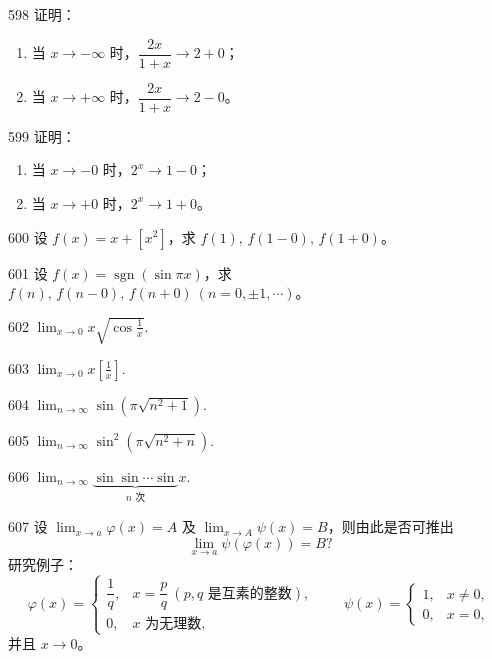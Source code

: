 \begin{prob}[M]{598}
证明：
\begin{enumerate}[label=(\alph*), itemsep=2pt, topsep=3pt]
  \item 当 $x \to -\infty$ 时，$\dfrac{2x}{1+x} \to 2 + 0$；
  \item 当 $x \to +\infty$ 时，$\dfrac{2x}{1+x} \to 2 - 0$。
\end{enumerate}
\end{prob}

\begin{prob}[M]{599}
证明：
\begin{enumerate}[label=(\alph*), itemsep=2pt, topsep=3pt]
  \item 当 $x \to -0$ 时，$2^x \to 1 - 0$；
  \item 当 $x \to +0$ 时，$2^x \to 1 + 0$。
\end{enumerate}
\end{prob}

\begin{prob}[S]{600}
设 $f(x) = x + [x^2]$，求 $f(1),\, f(1-0),\, f(1+0)$。
\end{prob}

\begin{prob}[S]{601}
设 $f(x) = \operatorname{sgn}(\sin\pi x)$，求 $f(n),\, f(n-0),\, f(n+0) \ (n = 0, \pm 1, \cdots)$。
\end{prob}


\begin{prob}[S]{602}
$\displaystyle \lim_{x\to 0} x\sqrt{\cos\frac{1}{x}}.$
\end{prob}

\begin{prob}[S]{603}
$\displaystyle \lim_{x\to 0} x\left[\frac{1}{x}\right].$
\end{prob}

\begin{prob}[S]{604}
$\displaystyle \lim_{n\to \infty} \sin(\pi\sqrt{n^2+1}).$
\end{prob}

\begin{prob}[S]{605}
$\displaystyle \lim_{n\to \infty} \sin^2(\pi\sqrt{n^2+n}).$
\end{prob}

\begin{prob}[S]{606}
$\displaystyle \lim_{n\to \infty} \underbrace{\sin\sin\cdots\sin}_{n\text{ 次}} x.$
\end{prob}

\begin{prob}[L]{607}
设 $\lim_{x\to a} \varphi(x) = A$ 及 $\lim_{x\to A} \psi(x) = B$，则由此是否可推出
\[
\lim_{x\to a} \psi(\varphi(x)) = B?
\]
研究例子：
\[
\varphi(x) = \begin{cases}
\dfrac{1}{q}, & x = \dfrac{p}{q} \ (p, q \text{ 是互素的整数}), \\[8pt]
0, & x \text{ 为无理数},
\end{cases}
\qquad
\psi(x) = \begin{cases}
1, & x \neq 0, \\
0, & x = 0,
\end{cases}
\]
并且 $x \to 0$。
\end{prob}

